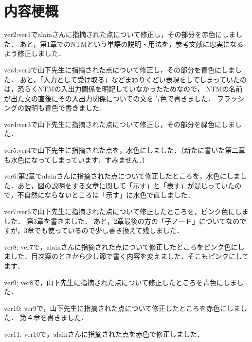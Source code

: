 \chapter*{内容梗概}
ver2:ver1でalainさんに指摘された点について修正し，その部分を赤色にしました．
あと，第1章でのNTMという単語の説明・用法を，参考文献に忠実になるよう修正しました．

ver3:ver2で山下先生に指摘された点について修正し，その部分を青色にしました．
あと，「入力として受け取る」などまわりくどい表現をしてしまっていたのは，恐らくNTMの入出力関係を明記していなかったためなので，
NTMの名前が出た文の直後にその入出力関係についての文を青色で書きました．
フラッシングの説明も青色で書きました．

ver4:ver3で山下先生に指摘された点について修正し，その部分を緑色にしました．

ver5:ver4で山下先生に指摘された点を，水色にしました．（新たに書いた第二章も水色になってしまっています．すみません．）

ver6:第2章でalainさんに指摘された点について修正したところを，水色にしました．あと，図の説明をする文章に関して「示す」と「表す」が混じっていたので，不自然にならないところは「示す」に水色で直しました．

ver7:ver6で山下先生に指摘された点について修正したところを，ピンク色にしました．
第3章を書きました．
あと，2章最後の方の「子ノード」についてなのですが，3章でも使っているので少し書き換えて残しました．

ver8:
ver7で，alainさんに指摘された点について修正したところをピンク色にしました．目次案のときから少し節で書く内容を変えました．そこもピンクにしてます．

ver9:
ver8で，山下先生に指摘された点について修正したところを青色にしました．

ver10: 
ver9で，山下先生に指摘された点について修正したところを赤色にしました．
第４章を書きました．

ver11: 
ver10で，alainさんに指摘された点を赤色で修正しました．

